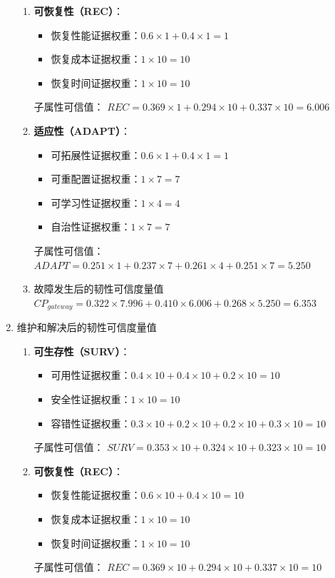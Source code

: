 \documentclass{article}
\begin{document}
\begin{enumerate}
\begin{enumerate}
		\item \textbf{可恢复性（REC）}：
		\begin{itemize}
			\item 恢复性能证据权重：$0.6 \times 1 + 0.4 \times 1 = 1$
			\item 恢复成本证据权重：$1 \times 10 = 10$
			\item 恢复时间证据权重：$1 \times 10 = 10$
		\end{itemize}
		子属性可信值：
		$ REC = 0.369 \times 1 + 0.294 \times 10 + 0.337 \times 10 = 6.006 $
		
		\item \textbf{适应性（ADAPT）}：
		\begin{itemize}
			\item 可拓展性证据权重：$0.6 \times 1 + 0.4 \times 1 = 1$
			\item 可重配置证据权重：$1 \times 7 = 7$
			\item 可学习性证据权重：$1 \times 4 = 4$
			\item 自治性证据权重：$1 \times 7 = 7$
		\end{itemize}
		子属性可信值：
		$ ADAPT = 0.251 \times 1 + 0.237 \times 7 + 0.261 \times 4 + 0.251 \times 7 = 5.250 $
		
		\item 故障发生后的韧性可信度量值 
		$ CP_{gateway} = 0.322 \times 7.996 + 0.410 \times 6.006 + 0.268 \times 5.250 = 6.353 $
	\end{enumerate}
	
	\item 维护和解决后的韧性可信度量值
	\begin{enumerate}
		\item \textbf{可生存性（SURV）}：
		\begin{itemize}
			\item 可用性证据权重：$0.4 \times 10 + 0.4 \times 10 + 0.2 \times 10 = 10$
			\item 安全性证据权重：$1 \times 10 = 10$
			\item 容错性证据权重：$0.3 \times 10 + 0.2 \times 10 + 0.2 \times 10 + 0.3 \times 10 = 10$
		\end{itemize}
		子属性可信值：
		$ SURV = 0.353 \times 10 + 0.324 \times 10 + 0.323 \times 10 = 10 $
		
		\item \textbf{可恢复性（REC）}：
		\begin{itemize}
			\item 恢复性能证据权重：$0.6 \times 10 + 0.4 \times 10 = 10$
			\item 恢复成本证据权重：$1 \times 10 = 10$
			\item 恢复时间证据权重：$1 \times 10 = 10$
		\end{itemize}
		子属性可信值：
		$ REC = 0.369 \times 10 + 0.294 \times 10 + 0.337 \times 10 = 10 $
		

\end{enumerate}
\end{enumerate}
\end{document}
